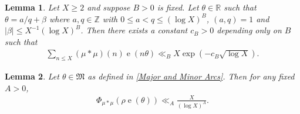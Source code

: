 \documentclass[10pt,a4paper]{amsart}
\newtheorem{lemma}{Lemma}
\newcommand{\e}{\operatorname{e}}
\begin{document}
\begin{lemma}\label{Partial Summation Lemma}
Let $X \geqslant 2$ and suppose $B>0$ is fixed. Let $\theta \in \mathbb{R}$ such that $\theta = a/q+\beta$ where $a,q \in \mathbb{Z}$ with $0 \leqslant a < q \leqslant(\log X)^B$, $(a,q)=1$ and $\lvert \beta \rvert \leqslant X ^{-1}(\log X)^B$. Then there exists a constant $c_B>0$ depending only on $B$ such that
\begin{align*}
    \sum_{n\leqslant X }(\mu*\mu)(n)\e(n\theta) \ll_B X\exp(-c_B\sqrt{\log X}).
\end{align*}
\end{lemma}

\begin{lemma}\label{Major Arcs Theorem}
Let $\theta \in \mathfrak{M}$ as defined in \eqref{Major and Minor Arcs}. Then for any fixed $A>0$,
\begin{align*}
        \Phi_{\mu * \mu}(\rho \e (\theta)) \ll_A \frac{X}{(\log X)^{A}}.
\end{align*}
\end{lemma}
\end{document}
